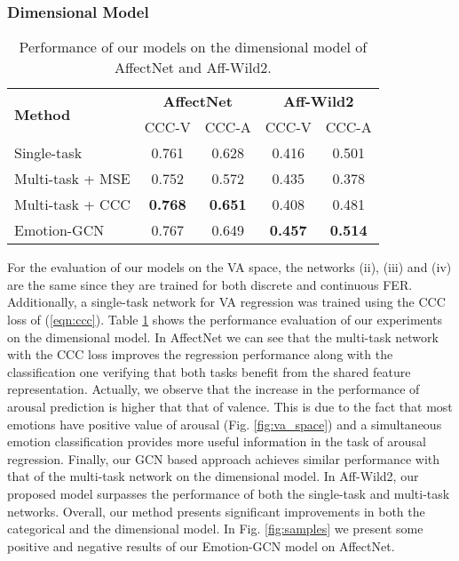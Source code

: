 \documentclass[a4paper, 10pt, conference]{ieeeconf}      \usepackage{FG2021}
\begin{document}
\subsubsection{Dimensional Model} 

\begin{table}[t]
  \caption{Performance of our models on the dimensional model of AffectNet and Aff-Wild2.}
  \label{table:results_ours_dim}
  \begin{center}
  \begin{tabular}{lcccc}
    \multirow{2}{*}{\textbf{Method}} & \multicolumn{2}{c}{\textbf{AffectNet}} & \multicolumn{2}{c}{\textbf{Aff-Wild2}} \\
    & CCC-V & CCC-A & CCC-V & CCC-A \\
    \toprule
    Single-task            & 0.761 & 0.628 & 0.416 & 0.501\\
    Multi-task + MSE       & 0.752 & 0.572 & 0.435 & 0.378\\
    Multi-task + CCC       & \textbf{0.768} & \textbf{0.651} & 0.408 & 0.481\\
    Emotion-GCN            & 0.767 & 0.649 & \textbf{0.457} & \textbf{0.514}\\
  \end{tabular}
  \end{center}
\end{table}

For the evaluation of our models on the VA space, the networks (ii), (iii) and (iv) are the same since they are trained for both discrete and continuous FER. Additionally, a single-task network for VA regression was trained using the CCC loss of (\ref{eqn:ccc}). Table \ref{table:results_ours_dim} shows the performance evaluation of our experiments on the dimensional model. In AffectNet we can see that the multi-task network with the CCC loss improves the regression performance along with the classification one verifying that both tasks benefit from the shared feature representation. Actually, we observe that the increase in the performance of arousal prediction is higher that that of valence. This is due to the fact that most emotions have positive value of arousal (Fig. \ref{fig:va_space}) and a simultaneous emotion classification provides more useful information in the task of arousal regression. Finally, our GCN based approach achieves similar performance with that of the multi-task network on the dimensional model. In Aff-Wild2, our proposed model surpasses the performance of both the single-task and multi-task networks. Overall, our method presents significant improvements in both the categorical and the dimensional model. In Fig. \ref{fig:samples} we present some positive and negative results of our Emotion-GCN model on AffectNet.
\end{document}

